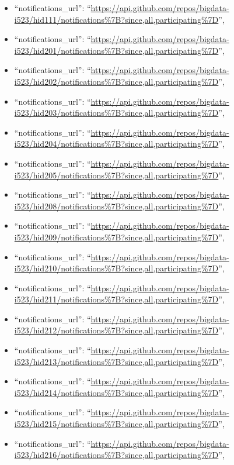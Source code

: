 \begin{itemize}
\item
  ``notifications\_url'':
  ``\url{https://api.github.com/repos/bigdata-i523/hid111/notifications\%7B?since,all,participating\%7D}'',
\item
  ``notifications\_url'':
  ``\url{https://api.github.com/repos/bigdata-i523/hid201/notifications\%7B?since,all,participating\%7D}'',
\item
  ``notifications\_url'':
  ``\url{https://api.github.com/repos/bigdata-i523/hid202/notifications\%7B?since,all,participating\%7D}'',
\item
  ``notifications\_url'':
  ``\url{https://api.github.com/repos/bigdata-i523/hid203/notifications\%7B?since,all,participating\%7D}'',
\item
  ``notifications\_url'':
  ``\url{https://api.github.com/repos/bigdata-i523/hid204/notifications\%7B?since,all,participating\%7D}'',
\item
  ``notifications\_url'':
  ``\url{https://api.github.com/repos/bigdata-i523/hid205/notifications\%7B?since,all,participating\%7D}'',
\item
  ``notifications\_url'':
  ``\url{https://api.github.com/repos/bigdata-i523/hid208/notifications\%7B?since,all,participating\%7D}'',
\item
  ``notifications\_url'':
  ``\url{https://api.github.com/repos/bigdata-i523/hid209/notifications\%7B?since,all,participating\%7D}'',
\item
  ``notifications\_url'':
  ``\url{https://api.github.com/repos/bigdata-i523/hid210/notifications\%7B?since,all,participating\%7D}'',
\item
  ``notifications\_url'':
  ``\url{https://api.github.com/repos/bigdata-i523/hid211/notifications\%7B?since,all,participating\%7D}'',
\item
  ``notifications\_url'':
  ``\url{https://api.github.com/repos/bigdata-i523/hid212/notifications\%7B?since,all,participating\%7D}'',
\item
  ``notifications\_url'':
  ``\url{https://api.github.com/repos/bigdata-i523/hid213/notifications\%7B?since,all,participating\%7D}'',
\item
  ``notifications\_url'':
  ``\url{https://api.github.com/repos/bigdata-i523/hid214/notifications\%7B?since,all,participating\%7D}'',
\item
  ``notifications\_url'':
  ``\url{https://api.github.com/repos/bigdata-i523/hid215/notifications\%7B?since,all,participating\%7D}'',
\item
  ``notifications\_url'':
  ``\url{https://api.github.com/repos/bigdata-i523/hid216/notifications\%7B?since,all,participating\%7D}'',

\end{itemize}
